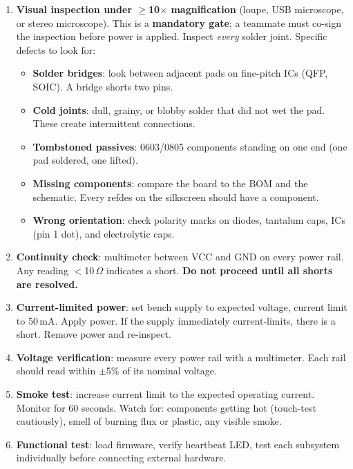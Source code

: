 \begin{enumerate}[leftmargin=1.5em]
\item \textbf{Visual inspection under $\geq$10$\times$ magnification} (loupe, USB microscope, or stereo microscope). This is a \textbf{mandatory gate}; a teammate must co-sign the inspection before power is applied. Inspect \emph{every} solder joint. Specific defects to look for:
\begin{itemize}[nosep,leftmargin=1.5em]
\item \textbf{Solder bridges}: look between adjacent pads on fine-pitch ICs (QFP, SOIC). A bridge shorts two pins.
\item \textbf{Cold joints}: dull, grainy, or blobby solder that did not wet the pad. These create intermittent connections.
\item \textbf{Tombstoned passives}: 0603/0805 components standing on one end (one pad soldered, one lifted).
\item \textbf{Missing components}: compare the board to the BOM and the schematic. Every refdes on the silkscreen should have a component.
\item \textbf{Wrong orientation}: check polarity marks on diodes, tantalum caps, ICs (pin 1 dot), and electrolytic caps.
\end{itemize}
\item \textbf{Continuity check}: multimeter between VCC and GND on every power rail. Any reading $<$10\,$\Omega$ indicates a short. \textbf{Do not proceed until all shorts are resolved.}
\item \textbf{Current-limited power}: set bench supply to expected voltage, current limit to 50\,mA. Apply power. If the supply immediately current-limits, there is a short. Remove power and re-inspect.
\item \textbf{Voltage verification}: measure every power rail with a multimeter. Each rail should read within $\pm$5\% of its nominal voltage.
\item \textbf{Smoke test}: increase current limit to the expected operating current. Monitor for 60 seconds. Watch for: components getting hot (touch-test cautiously), smell of burning flux or plastic, any visible smoke.
\item \textbf{Functional test}: load firmware, verify heartbeat LED, test each subsystem individually before connecting external hardware.
\end{enumerate}


